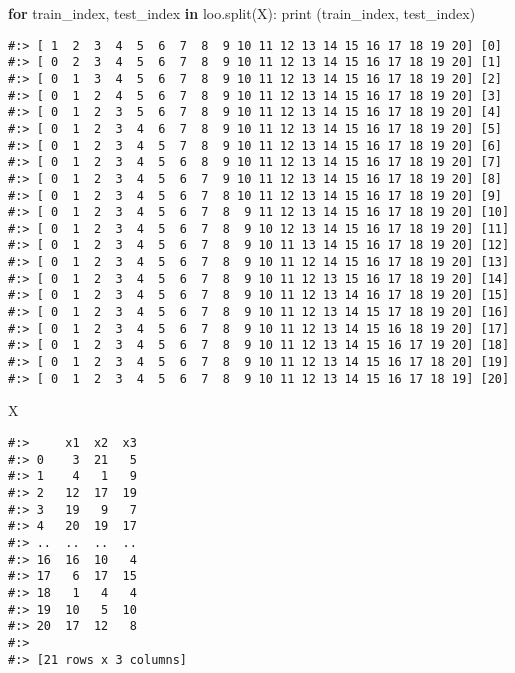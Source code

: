 \documentclass[
]{book}
\newenvironment{Shaded}{\begin{snugshade}}{\end{snugshade}}
\newcommand{\BuiltInTok}[1]{#1}
\newcommand{\ControlFlowTok}[1]{\textcolor[rgb]{0.27,0.27,0.27}{\textbf{#1}}}
\newcommand{\KeywordTok}[1]{\textcolor[rgb]{0.27,0.27,0.27}{\textbf{#1}}}
\newcommand{\NormalTok}[1]{#1}
\begin{document}
\begin{Shaded}
\begin{Highlighting}[]
\ControlFlowTok{for}\NormalTok{ train\_index, test\_index }\KeywordTok{in}\NormalTok{ loo.split(X):}
  \BuiltInTok{print}\NormalTok{ (train\_index, test\_index)}
\end{Highlighting}
\end{Shaded}

\begin{verbatim}
#:> [ 1  2  3  4  5  6  7  8  9 10 11 12 13 14 15 16 17 18 19 20] [0]
#:> [ 0  2  3  4  5  6  7  8  9 10 11 12 13 14 15 16 17 18 19 20] [1]
#:> [ 0  1  3  4  5  6  7  8  9 10 11 12 13 14 15 16 17 18 19 20] [2]
#:> [ 0  1  2  4  5  6  7  8  9 10 11 12 13 14 15 16 17 18 19 20] [3]
#:> [ 0  1  2  3  5  6  7  8  9 10 11 12 13 14 15 16 17 18 19 20] [4]
#:> [ 0  1  2  3  4  6  7  8  9 10 11 12 13 14 15 16 17 18 19 20] [5]
#:> [ 0  1  2  3  4  5  7  8  9 10 11 12 13 14 15 16 17 18 19 20] [6]
#:> [ 0  1  2  3  4  5  6  8  9 10 11 12 13 14 15 16 17 18 19 20] [7]
#:> [ 0  1  2  3  4  5  6  7  9 10 11 12 13 14 15 16 17 18 19 20] [8]
#:> [ 0  1  2  3  4  5  6  7  8 10 11 12 13 14 15 16 17 18 19 20] [9]
#:> [ 0  1  2  3  4  5  6  7  8  9 11 12 13 14 15 16 17 18 19 20] [10]
#:> [ 0  1  2  3  4  5  6  7  8  9 10 12 13 14 15 16 17 18 19 20] [11]
#:> [ 0  1  2  3  4  5  6  7  8  9 10 11 13 14 15 16 17 18 19 20] [12]
#:> [ 0  1  2  3  4  5  6  7  8  9 10 11 12 14 15 16 17 18 19 20] [13]
#:> [ 0  1  2  3  4  5  6  7  8  9 10 11 12 13 15 16 17 18 19 20] [14]
#:> [ 0  1  2  3  4  5  6  7  8  9 10 11 12 13 14 16 17 18 19 20] [15]
#:> [ 0  1  2  3  4  5  6  7  8  9 10 11 12 13 14 15 17 18 19 20] [16]
#:> [ 0  1  2  3  4  5  6  7  8  9 10 11 12 13 14 15 16 18 19 20] [17]
#:> [ 0  1  2  3  4  5  6  7  8  9 10 11 12 13 14 15 16 17 19 20] [18]
#:> [ 0  1  2  3  4  5  6  7  8  9 10 11 12 13 14 15 16 17 18 20] [19]
#:> [ 0  1  2  3  4  5  6  7  8  9 10 11 12 13 14 15 16 17 18 19] [20]
\end{verbatim}

\begin{Shaded}
\begin{Highlighting}[]
\NormalTok{X}
\end{Highlighting}
\end{Shaded}

\begin{verbatim}
#:>     x1  x2  x3
#:> 0    3  21   5
#:> 1    4   1   9
#:> 2   12  17  19
#:> 3   19   9   7
#:> 4   20  19  17
#:> ..  ..  ..  ..
#:> 16  16  10   4
#:> 17   6  17  15
#:> 18   1   4   4
#:> 19  10   5  10
#:> 20  17  12   8
#:> 
#:> [21 rows x 3 columns]
\end{verbatim}
\end{document}
